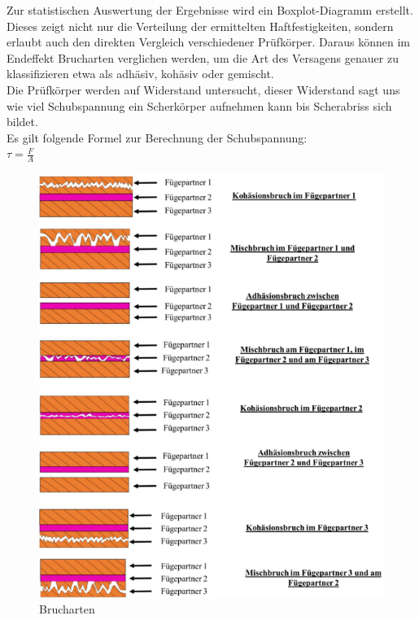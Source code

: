Zur statistischen Auswertung der Ergebnisse wird ein Boxplot-Diagramm erstellt. 
Dieses zeigt nicht nur die Verteilung der ermittelten Haftfestigkeiten, sondern erlaubt auch den direkten Vergleich verschiedener Prüfkörper.
Daraus können im Endeffekt Brucharten verglichen werden, um die Art des Versagens genauer zu klassifizieren etwa als adhäsiv, kohäsiv oder gemischt.\\
Die Prüfkörper werden auf Widerstand untersucht, dieser Widerstand sagt uns wie viel Schubspannung ein Scherkörper aufnehmen kann bis Scherabriss sich bildet.\\
Es gilt folgende Formel zur Berechnung der Schubspannung:\\
$\tau = \frac{F}{A}$
\vspace{0.2cm}
\begin{figure}
    \centering
    \includegraphics{Bilder/Brucharten.png}
    \caption{Brucharten}
    \vspace{0.2cm}
    \label{Abb.3: Brucharten}
\end{figure}
\\
